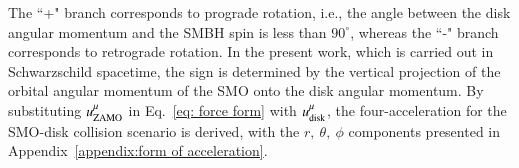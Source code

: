 \documentclass[aps,prx,reprint,superscriptaddress,nofootinbib,longbibliography]{revtex4-1}
\begin{document}
The ``+" branch corresponds to prograde rotation, i.e., the angle between the disk angular momentum and the SMBH spin is less than $90^{\circ}$, whereas the ``-" branch corresponds to retrograde rotation. In the present work, which is carried out in Schwarzschild spacetime, the sign is determined by the vertical projection of the orbital angular momentum of the SMO onto the disk angular momentum. By substituting $u^{\mu}_{\rm ZAMO}$ in Eq.~\eqref{eq: force form} with $u^{\mu}_{\rm disk}$, the four-acceleration for the SMO-disk collision scenario is derived, with the $r,\ \theta,\ \phi$ components presented in Appendix~\ref{appendix:form of acceleration}.
\end{document}
